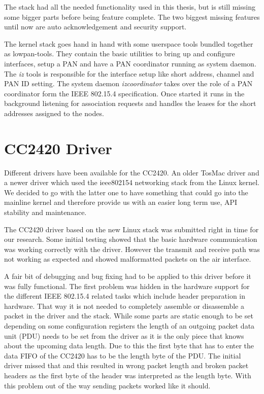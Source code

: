 The stack had all the needed functionality used in this thesis, but is still
missing some bigger parts before being feature complete. The two biggest missing
features until now are auto acknowledgement and security support.

The kernel stack goes hand in hand with some userspace tools bundled together as
lowpan-tools. They contain the basic utilities to bring up and configure
interfaces, setup a PAN and have a PAN coordinator running as system daemon. The
\emph{iz} tools is responsible for the interface setup like short address,
channel and PAN ID setting. The system daemon \emph{izcoordinator} takes over
the role of a PAN coordinator form the IEEE 802.15.4 specification. Once started
it runs in the background listening for association requests and handles the
leases for the short addresses assigned to the nodes.

\section{CC2420 Driver}
Different drivers have been available for the CC2420. An older TosMac driver and
a newer driver which used the ieee802154 networking stack from the Linux kernel.
We decided to go with the latter one to have something that could go into the
mainline kernel and therefore provide us with an easier long term use, API
stability and maintenance.

The CC2420 driver based on the new Linux stack was submitted right in time for
our research. Some initial testing showed that the basic hardware communication
was working correctly with the driver. However the transmit and receive path was
not working as expected and showed malformatted packets on the air interface.

A fair bit of debugging and bug fixing had to be applied to this driver
before it was fully functional. The first problem was hidden in the hardware
support for the different IEEE 802.15.4 related tasks which include  header
preparation in hardware. That way it is not needed to
completely assemble or disassemble a packet in the driver and the stack. While
some parts are static enough to be set depending on some configuration registers
the length of an outgoing packet data unit (PDU) needs to be set from the driver
as it is the only piece that knows about the upcoming data length. Due to this
the first byte that has to enter the data FIFO of the CC2420 has to be the
length byte of the PDU. The initial driver missed that and this resulted in
wrong packet length and broken packet headers as the first byte of the header
was interpreted as the length byte. With this problem out of the way sending
packets worked like it should.

